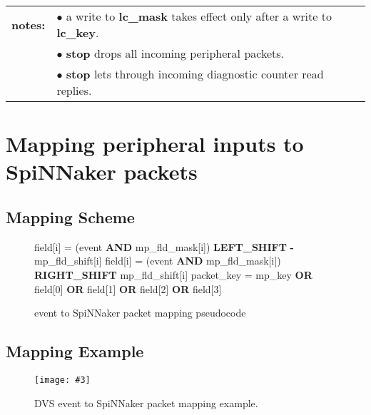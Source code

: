 \documentclass[11pt,a4paper,twoside]{article}
\newcommand{\image}[5][]
{
\begin{figure}[#2]
   \begin{center}
      \texttt{[image: \#3]}
      \caption{#5}
      \label{fig:#4}
   \end{center}
\end{figure}
}
\begin{document}
\begin{center}
	\begin{tabularx}{\textwidth}{| l X |}
		\hline
		\textbf{notes:} & $\bullet$ a write to \textbf{lc\_mask} takes effect only after  a write to \textbf{lc\_key}. \\%
		& $\bullet$ \textbf{stop} drops all incoming peripheral packets. \\%
		& $\bullet$ \textbf{stop} lets through incoming diagnostic counter read replies. \\%
		\hline
	\end{tabularx}
\end{center}


\clearpage
\section{Mapping peripheral inputs to SpiNNaker packets}


\subsection{Mapping Scheme}


\begin{figure}[!ht]
	\centering
	\begin{minipage}{0.95\columnwidth}
		\begin{algorithm}[H]
			\caption{event to SpiNNaker packet mapping pseudocode}
			\begin{algorithmic}[1]
					    \State field[i] = (event \textbf{AND} mp\_fld\_mask[i]) \textbf{LEFT\_SHIFT} \textbf{-}mp\_fld\_shift[i]
				    \Else
					    \State field[i] = (event \textbf{AND} mp\_fld\_mask[i]) \textbf{RIGHT\_SHIFT} mp\_fld\_shift[i]
					\EndIf
				\EndFor
				\State packet\_key = mp\_key \textbf{OR} field[0] \textbf{OR} field[1] \textbf{OR} field[2] \textbf{OR} field[3]
			\end{algorithmic}
			\label{alg:crd+cfc_fifo}
		\end{algorithm}
	\end{minipage}
\end{figure}


\subsection{Mapping Example}


\image[width = 0.9 \textwidth]{!h}{mapper_ex}{fig:maper_fig}
{DVS event to SpiNNaker packet mapping example.}
\end{document}
